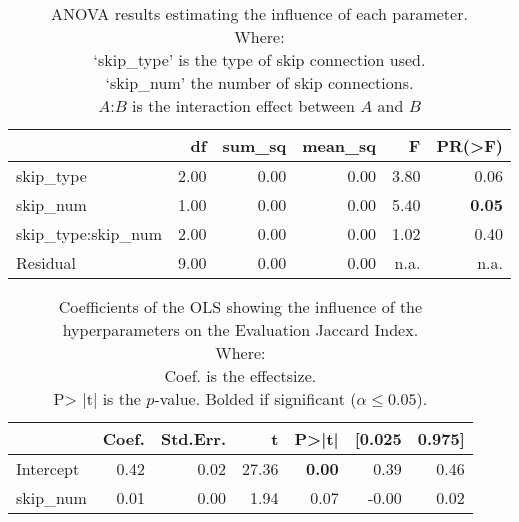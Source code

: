 \begin{table}[ht]
\centering
\caption{ANOVA results estimating the influence of each parameter.\\Where: \\\hphantom{tabb}`skip\_type' is the type of skip connection used.\\\hphantom{tabb}`skip\_num' the number of skip connections.\\\hphantom{tabb}$A$:$B$ is the interaction effect between $A$ and $B$}
\label{tab:skip_importance_anova_all}
\begin{tabular}{lrrrrr}
\toprule
 & df & sum\_sq & mean\_sq & F & PR(>F) \\
\midrule
skip\_type & 2.00 & 0.00 & 0.00 & 3.80 & 0.06 \\
skip\_num & 1.00 & 0.00 & 0.00 & 5.40 & \textbf{0.05} \\
skip\_type:skip\_num & 2.00 & 0.00 & 0.00 & 1.02 & 0.40 \\
Residual & 9.00 & 0.00 & 0.00 & n.a. & n.a. \\
\bottomrule
\end{tabular}
\end{table}


\begin{table}[ht]
\centering
\caption{Coefficients of the OLS showing the influence of the hyperparameters on the Evaluation Jaccard Index.\\Where:\\\hphantom{tabb}Coef. is the effectsize.\\\hphantom{tabb}P> |t| is the $p$-value. Bolded if significant ($\alpha\le0.05$).}
\label{tab:skip_importance_ols_effects}
\begin{tabular}{lrrrrrr}
\toprule
 & Coef. & Std.Err. & t & P>|t| & [0.025 & 0.975] \\
\midrule
Intercept & 0.42 & 0.02 & 27.36 & \textbf{0.00} & 0.39 & 0.46 \\
skip\_num & 0.01 & 0.00 & 1.94 & 0.07 & -0.00 & 0.02 \\
\bottomrule
\end{tabular}
\end{table}
